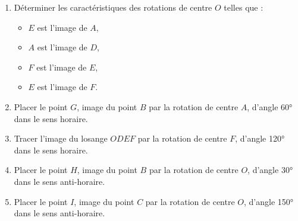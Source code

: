 \begin{exercice*}
\begin{enumerate}
\begin{multicols}{2}
\begin{itemize}
                \item du losange $OABC$.
            \end{itemize}
        \end{multicols}
        \item Déterminer les caractéristiques des rotations de centre $O$ telles que :
        \begin{multicols}{2}
            \begin{itemize}
                \item $E$ est l'image de $A$,
                \item $A$ est l'image de $D$,
                \item $F$ est l'image de $E$,
                \item $E$ est l'image de $F$.
            \end{itemize}
        \end{multicols}
        \item Placer le point $G$, image du point $B$ par la rotation de centre $A$, d'angle \ang{60} dans le sens horaire.
        \item Tracer l'image du losange $ODEF$ par la rotation de centre $F$, d'angle \ang{120} dans le sens horaire.
        \item Placer le point $H$, image du point $B$ par la rotation de centre $O$, d'angle \ang{30} dans le sens anti-horaire.
        \item Placer le point $I$, image du point $C$ par la rotation de centre $O$, d'angle \ang{150} dans le sens anti-horaire.
    \end{enumerate}
\end{exercice*}
